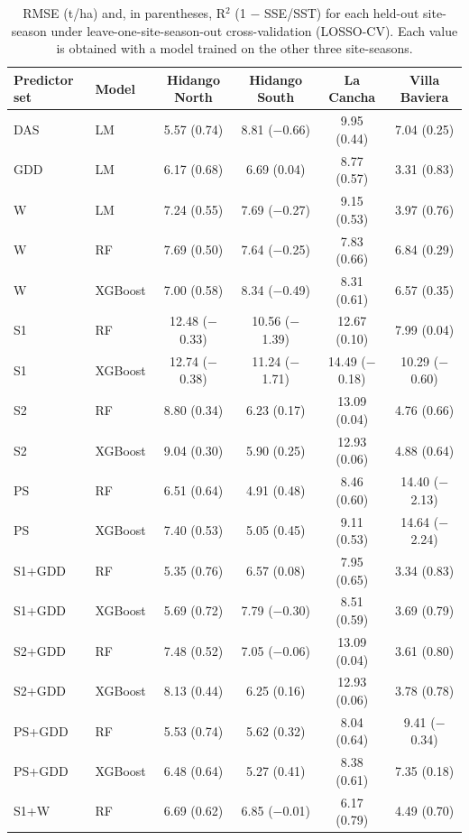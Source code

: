 \begin{table}[htbp]
\centering
\footnotesize
\caption{RMSE (t/ha) and, in parentheses, R$^2$ (1 $-$ SSE/SST) for each held-out site-season under leave-one-site-season-out cross-validation (LOSSO-CV). Each value is obtained with a model trained on the other three site-seasons.}
\begin{tabular}{l l c c c c}
\toprule
\textbf{Predictor set} & \textbf{Model} & \textbf{Hidango North} & \textbf{Hidango South} & \textbf{La Cancha} & \textbf{Villa Baviera} \\
\midrule
DAS & LM & 5.57 (0.74) & 8.81 ($-$0.66) & 9.95 (0.44) & 7.04 (0.25) \\
GDD & LM & 6.17 (0.68) & 6.69 (0.04) & 8.77 (0.57) & 3.31 (0.83) \\
W & LM & 7.24 (0.55) & 7.69 ($-$0.27) & 9.15 (0.53) & 3.97 (0.76) \\
W & RF & 7.69 (0.50) & 7.64 ($-$0.25) & 7.83 (0.66) & 6.84 (0.29) \\
W & XGBoost & 7.00 (0.58) & 8.34 ($-$0.49) & 8.31 (0.61) & 6.57 (0.35) \\
S1 & RF & 12.48 ($-$0.33) & 10.56 ($-$1.39) & 12.67 (0.10) & 7.99 (0.04) \\
S1 & XGBoost & 12.74 ($-$0.38) & 11.24 ($-$1.71) & 14.49 ($-$0.18) & 10.29 ($-$0.60) \\
S2 & RF & 8.80 (0.34) & 6.23 (0.17) & 13.09 (0.04) & 4.76 (0.66) \\
S2 & XGBoost & 9.04 (0.30) & 5.90 (0.25) & 12.93 (0.06) & 4.88 (0.64) \\
PS & RF & 6.51 (0.64) & 4.91 (0.48) & 8.46 (0.60) & 14.40 ($-$2.13) \\
PS & XGBoost & 7.40 (0.53) & 5.05 (0.45) & 9.11 (0.53) & 14.64 ($-$2.24) \\
S1+GDD & RF & 5.35 (0.76) & 6.57 (0.08) & 7.95 (0.65) & 3.34 (0.83) \\
S1+GDD & XGBoost & 5.69 (0.72) & 7.79 ($-$0.30) & 8.51 (0.59) & 3.69 (0.79) \\
S2+GDD & RF & 7.48 (0.52) & 7.05 ($-$0.06) & 13.09 (0.04) & 3.61 (0.80) \\
S2+GDD & XGBoost & 8.13 (0.44) & 6.25 (0.16) & 12.93 (0.06) & 3.78 (0.78) \\
PS+GDD & RF & 5.53 (0.74) & 5.62 (0.32) & 8.04 (0.64) & 9.41 ($-$0.34) \\
PS+GDD & XGBoost & 6.48 (0.64) & 5.27 (0.41) & 8.38 (0.61) & 7.35 (0.18) \\
S1+W & RF & 6.69 (0.62) & 6.85 ($-$0.01) & 6.17 (0.79) & 4.49 (0.70) \\

\end{tabular}
\end{table}
